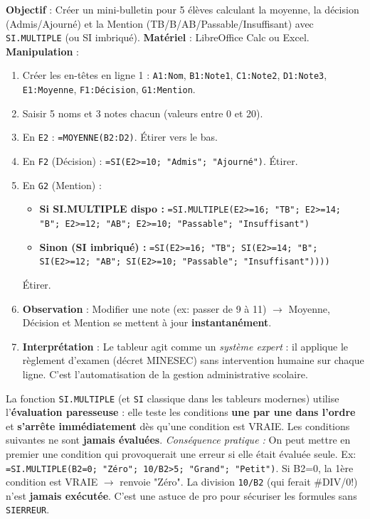 \documentclass[11pt]{article}
\begin{document}
\begin{experience}
\textbf{Objectif} : Créer un mini-bulletin pour 5 élèves calculant la moyenne, la décision (Admis/Ajourné) et la Mention (TB/B/AB/Passable/Insuffisant) avec \texttt{SI.MULTIPLE} (ou SI imbriqué).
\textbf{Matériel} : LibreOffice Calc ou Excel.
\textbf{Manipulation} :
\begin{enumerate}
    \item Créer les en-têtes en ligne 1 : \texttt{A1:Nom}, \texttt{B1:Note1}, \texttt{C1:Note2}, \texttt{D1:Note3}, \texttt{E1:Moyenne}, \texttt{F1:Décision}, \texttt{G1:Mention}.
    \item Saisir 5 noms et 3 notes chacun (valeurs entre 0 et 20).
    \item En \texttt{E2} : \texttt{=MOYENNE(B2:D2)}. Étirer vers le bas.
    \item En \texttt{F2} (Décision) : \texttt{=SI(E2>=10; "Admis"; "Ajourné")}. Étirer.
    \item En \texttt{G2} (Mention) :
    \begin{itemize}
        \item \textbf{Si SI.MULTIPLE dispo :} \texttt{=SI.MULTIPLE(E2>=16; "TB"; E2>=14; "B"; E2>=12; "AB"; E2>=10; "Passable"; "Insuffisant")}
        \item \textbf{Sinon (SI imbriqué) :} \texttt{=SI(E2>=16; "TB"; SI(E2>=14; "B"; SI(E2>=12; "AB"; SI(E2>=10; "Passable"; "Insuffisant"))))}
    \end{itemize}
    Étirer.
    \item \textbf{Observation} : Modifier une note (ex: passer de 9 à 11) $\to$ Moyenne, Décision et Mention se mettent à jour \textbf{instantanément}.
    \item \textbf{Interprétation} : Le tableur agit comme un \emph{système expert} : il applique le règlement d'examen (décret MINESEC) sans intervention humaine sur chaque ligne. C'est l'automatisation de la gestion administrative scolaire.
\end{enumerate}
\end{experience}

\begin{savaistu}
La fonction \texttt{SI.MULTIPLE} (et \texttt{SI} classique dans les tableurs modernes) utilise l'\textbf{évaluation paresseuse} : elle teste les conditions \textbf{une par une dans l'ordre} et \textbf{s'arrête immédiatement} dès qu'une condition est VRAIE. Les conditions suivantes ne sont \textbf{jamais évaluées}.
\emph{Conséquence pratique :} On peut mettre en premier une condition qui provoquerait une erreur si elle était évaluée seule. Ex: \texttt{=SI.MULTIPLE(B2=0; "Zéro"; 10/B2>5; "Grand"; "Petit")}. Si B2=0, la 1ère condition est VRAIE $\to$ renvoie "Zéro". La division \texttt{10/B2} (qui ferait \#DIV/0!) n'est \textbf{jamais exécutée}. C'est une astuce de pro pour sécuriser les formules sans \texttt{SIERREUR}.
\end{savaistu}
\end{document}
